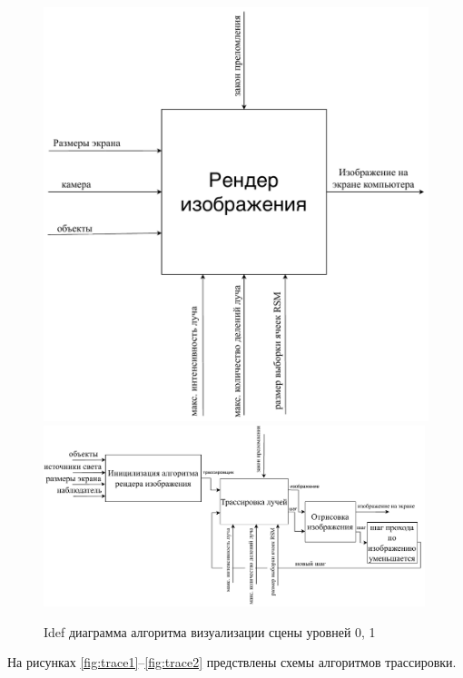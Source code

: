 {    \begin{figure}[H]
    	\centering
    	\includegraphics[height=0.5\textheight]{img/idef0.pdf}
        \includegraphics[width=0.99\textwidth]{img/idef1.pdf}
    	\caption{Idef диаграмма алгоритма визуализации сцены уровней 0, 1}
    	\label{fig:idefs}
    \end{figure}

    \vspace{5cm}
    На рисунках \ref{fig:trace1}--\ref{fig:trace2} предствлены
    схемы алгоритмов трассировки.

}
